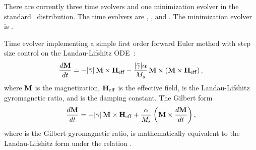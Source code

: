 There are currently three time evolvers and one minimization evolver in the
standard \OOMMF\ distribution.  The time evolvers are
,
, and
.
The minimization evolver is
.
\begin{description}
%
\item[Oxs\_EulerEvolve:\label{html:EulerEvolve}]
Time evolver implementing a simple first order forward Euler method with
step size control on the Landau-Lifshitz
ODE~\cite{gilbert1955,landau1935}:\\
\begin{equation}
\htmlimage{antialias}
  \frac{d\vM}{dt} = -|\bar{\gamma}|\,\vM\times\vH_{\rm eff}
   - \frac{|\bar{\gamma}|\alpha}{M_s}\,
     \vM\times\left(\vM\times\vH_{\rm eff}\right),
\label{eq:oxsllode}
\end{equation}
where $\textbf{M}$ is the magnetization, $\textbf{H}_{\rm eff}$ is the effective
field, \abovemath{\bar{\gamma}} is the Landau-Lifshitz gyromagnetic ratio, and
\abovemath{\alpha} is the damping constant. The Gilbert form
\begin{equation}
\htmlimage{antialias}
  \frac{d\vM}{dt} = -|\gamma|\,\vM\times\vH_{\rm eff}
   + \frac{\alpha}{M_s}
     \left(\vM\times\frac{d\vM}{dt}\right),
\label{eq:oxsllgode}
\end{equation}
where \abovemath{\gamma} is the Gilbert gyromagnetic ratio, is
mathematically equivalent to the Landau-Lifshitz form under the
relation .


\end{description}
